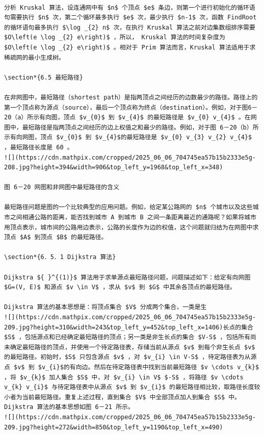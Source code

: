 \documentclass[10pt]{article}
\begin{document}
\begin{verbatim}

分析 Kruskal 算法，设连通网中有 $n$ 个顶点 $e$ 条边，则第一个进行初始化的循环语句需要执行 $n$ 次，第二个循环最多执行 $e$ 次，最少执行 $n-1$ 次，函数 FindRoot 的循环语句最多执行 $\log _{2} n$ 次，在执行 Kruskal 算法之前对边集数组排序需要 $O\left(e \log _{2} e\right)$ ，所以， Kruskal 算法的时间复杂度为 $O\left(e \log _{2} e\right)$ 。相对于 Prim 算法而言，Kruskal 算法适用于求稀疏网的最小生成树。

\section*{6.5 最短路径}

在非网图中，最短路径（shortest path）是指两顶点之间经历的边数最少的路径。路径上的第一个顶点称为源点（source），最后一个顶点称为终点（destination）。例如，对于图6－20（a）所示有向图，顶点 $v_{0}$ 到 $v_{4}$ 的最短路径是 $v_{0} v_{4}$ 。在网图中，最短路径是指两顶点之间经历的边上权值之和最少的路径。例如，对于图 6－20（b）所示有向网图，顶点 $v_{0}$ 到 $v_{4}$的最短路径是 $v_{0} v_{3} v_{2} v_{4}$ ，最短路径长度是 60 。
![](https://cdn.mathpix.com/cropped/2025_06_06_704745ea57b15b2333e5g-208.jpg?height=394&width=906&top_left_y=1968&top_left_x=348)

图 6－20 网图和非网图中最短路径的含义

最短路径问题是图的一个比较典型的应用问题。例如，给定某公路网的 $n$ 个城市以及这些城市之间相通公路的距离，能否找到城市 A 到城市 B 之间一条距离最近的通路呢？如果将城市用顶点表示，城市间的公路用边表示，公路的长度作为边的权值，这个问题就归结为在网图中求顶点 $A$ 到顶点 $B$ 的最短路径。

\section*{6．5．1 Dijkstra 算法}

Dijkstra ${ }^{(1)}$ 算法用于求单源点最短路径问题，问题描述如下：给定有向网图 $G=(V, E)$ 和源点 $v \in V$ ，求从 $v$ 到 $G$ 中其余各顶点的最短路径。

Dijkstra 算法的基本思想是：将顶点集合 $V$ 分成两个集合，一类是生
![](https://cdn.mathpix.com/cropped/2025_06_06_704745ea57b15b2333e5g-209.jpg?height=310&width=243&top_left_y=452&top_left_x=1406)长点的集合 $S$ ，包括源点和已经确定最短路径的顶点；另一类是非生长点的集合 $V-S$ ，包括所有尚未确定最短路径的顶点，并使用一个待定路径表，存储当前从源点 $v$ 到每个非生长点 $v$ 的最短路径。初始时，$S$ 只包含源点 $v$ ，对 $v_{i} \in V-S$ ，待定路径表为从源点 $v$ 到 $v_{i}$的有向边。然后在待定路径表中找到当前最短路径 $v \cdots v_{k}$ ，将 $v_{k}$ 加人集合 $S$ 中，对 $v_{i} \in V$ $-S$ ，将路径 $v \cdots v_{k} v_{i}$ 与待定路径表中从源点 $v$ 到 $v_{i}$ 的最短路径相比较，取路径长度较小者为当前最短路径。重复上述过程，直到集合 $V$ 中全部顶点加人到集合 $S$ 中。Dijkstra 算法的基本思想如图 6－21 所示。
![](https://cdn.mathpix.com/cropped/2025_06_06_704745ea57b15b2333e5g-209.jpg?height=272&width=850&top_left_y=1190&top_left_x=490)


\end{verbatim}
\end{document}
